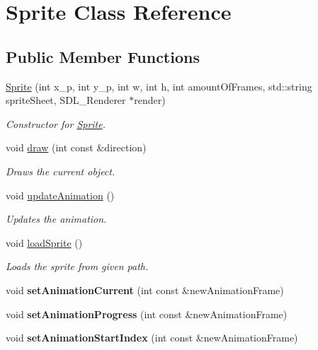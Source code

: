 \hypertarget{class_sprite}{}\section{Sprite Class Reference}
\label{class_sprite}
\subsection*{Public Member Functions}
\begin{DoxyCompactItemize}
\item 
\hyperlink{class_sprite_a7ae031c9623419893c010c4587a42d00}{Sprite} (int x\+\_\+p, int y\+\_\+p, int w, int h, int amount\+Of\+Frames, std\+::string sprite\+Sheet, S\+D\+L\+\_\+\+Renderer $\ast$render)
\begin{DoxyCompactList}\small\item\em Constructor for \hyperlink{class_sprite}{Sprite}. \end{DoxyCompactList}\item 
void \hyperlink{class_sprite_aa97420bd41d1f70eae5d0ec8c4e83b50}{draw} (int const \&direction)
\begin{DoxyCompactList}\small\item\em Draws the current object. \end{DoxyCompactList}\item 
void \hyperlink{class_sprite_a5e70e16bf7e519926dee9b96b71ae6a0}{update\+Animation} ()
\begin{DoxyCompactList}\small\item\em Updates the animation. \end{DoxyCompactList}\item 
void \hyperlink{class_sprite_a8c446bde8c4fc3e36252bbf2b26e2833}{load\+Sprite} ()
\begin{DoxyCompactList}\small\item\em Loads the sprite from given path. \end{DoxyCompactList}\item 
\hypertarget{class_sprite_abfc114955c893dc7d00b872eeb62ab59}{}void {\bfseries set\+Animation\+Current} (int const \&new\+Animation\+Frame)\label{class_sprite_abfc114955c893dc7d00b872eeb62ab59}

\item 
\hypertarget{class_sprite_af12c44d4b19efdaa6ce51e1fcad8b086}{}void {\bfseries set\+Animation\+Progress} (int const \&new\+Animation\+Frame)\label{class_sprite_af12c44d4b19efdaa6ce51e1fcad8b086}

\item 
\hypertarget{class_sprite_aaa7d9a9582651ff62dcb4a051926c342}{}void {\bfseries set\+Animation\+Start\+Index} (int const \&new\+Animation\+Frame)\label{class_sprite_aaa7d9a9582651ff62dcb4a051926c342}


\end{DoxyCompactItemize}
